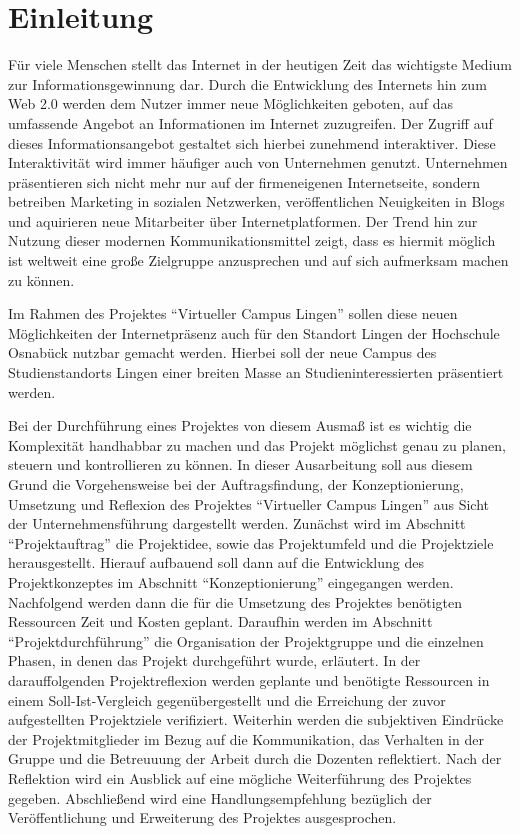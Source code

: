 \section{Einleitung}
\label{sec:Einleitung}
Für viele Menschen stellt das Internet in der heutigen Zeit das wichtigste
Medium zur Informationsgewinnung dar. Durch die Entwicklung des Internets hin
zum Web 2.0 werden dem Nutzer immer neue Möglichkeiten geboten, auf das
umfassende Angebot an Informationen im Internet zuzugreifen. Der Zugriff auf
dieses Informationsangebot gestaltet sich hierbei zunehmend interaktiver.
Diese Interaktivität wird immer häufiger auch von Unternehmen genutzt.
Unternehmen präsentieren sich nicht mehr nur auf der firmeneigenen
Internetseite, sondern betreiben Marketing in sozialen Netzwerken,
veröffentlichen Neuigkeiten in Blogs und aquirieren neue Mitarbeiter über
Internetplatformen. Der Trend hin zur Nutzung dieser modernen
Kommunikationsmittel zeigt, dass es hiermit möglich ist weltweit eine große
Zielgruppe anzusprechen und auf sich aufmerksam machen zu können.

Im Rahmen des Projektes "`Virtueller Campus Lingen"' sollen diese neuen
Möglichkeiten der Internetpräsenz auch für den Standort Lingen der Hochschule
Osnabück nutzbar gemacht werden. Hierbei soll der neue Campus des
Studienstandorts Lingen einer breiten Masse an Studieninteressierten
präsentiert werden.

Bei der Durchführung eines Projektes von diesem Ausmaß ist es wichtig die
Komplexität handhabbar zu machen und das Projekt möglichst genau zu planen,
steuern und kontrollieren zu können. In dieser Ausarbeitung soll aus diesem
Grund die Vorgehensweise bei der Auftragsfindung, der Konzeptionierung,
Umsetzung und Reflexion des Projektes "`Virtueller Campus Lingen"' aus Sicht der
Unternehmensführung dargestellt werden. Zunächst wird im Abschnitt
"`Projektauftrag"' die Projektidee, sowie das Projektumfeld und die Projektziele
herausgestellt. Hierauf aufbauend soll dann auf die Entwicklung des
Projektkonzeptes im Abschnitt "`Konzeptionierung"' eingegangen werden.
Nachfolgend werden dann die für die Umsetzung des Projektes benötigten
Ressourcen Zeit und Kosten geplant. Daraufhin werden im Abschnitt
"`Projektdurchführung"' die Organisation der Projektgruppe und die einzelnen
Phasen, in denen das Projekt durchgeführt wurde, erläutert. In der
darauffolgenden Projektreflexion werden geplante und benötigte Ressourcen in
einem Soll-Ist-Vergleich gegenübergestellt und die Erreichung der zuvor
aufgestellten Projektziele verifiziert. Weiterhin werden die subjektiven
Eindrücke der Projektmitglieder im Bezug auf die Kommunikation, das Verhalten
in der Gruppe und die Betreuuung der Arbeit durch die Dozenten reflektiert. Nach
der Reflektion wird ein Ausblick auf eine mögliche Weiterführung des Projektes
gegeben. Abschließend wird eine Handlungsempfehlung bezüglich der 
Veröffentlichung und Erweiterung des Projektes ausgesprochen.